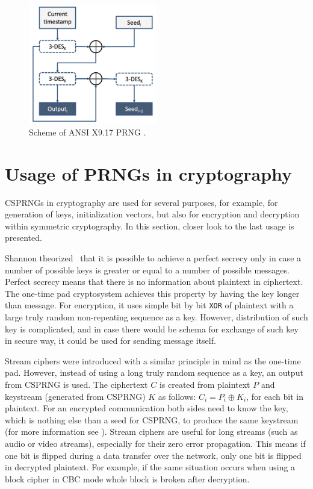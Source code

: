 \documentclass[
    digital,    %
    oneside,    %
    color,
    11pt,
    nocover,
    notable,
    nolof,
    nolot,
    final
]{fithesis3}
\renewcommand\_{\textunderscore\allowbreak}
\begin{document}
\begin{figure}[h]
	\centering
	\includegraphics[width=0.5\textwidth]{./images/pictures/x9-17-prng.png}
	\caption{Scheme of ANSI X9.17 PRNG \cite{ansi1985american,kelsey1998cryptanalytic}.}
	\label{fig:x9-17}
\end{figure}

\section{Usage of PRNGs in cryptography}

CSPRNGs in cryptography are used for several purposes, for example, for generation of keys, initialization vectors, but also for encryption and decryption within symmetric cryptography. In this section, closer look to the last usage is presented.

Shannon theorized~\cite{perfect-secrecy} that it is possible to achieve a perfect secrecy only in case a number of possible keys is greater or equal to a number of possible messages. Perfect secrecy means that there is no information about plaintext in ciphertext. The one-time pad cryptosystem achieves this property by having the key longer than message. For encryption, it uses simple bit by bit \texttt{XOR} of plaintext with a large truly random non-repeating sequence as a key. However, distribution of such key is complicated, and in case there would be schema for exchange of such key in secure way, it could be used for sending message itself. \cite{schneier1996applied}

Stream ciphers were introduced with a similar principle in mind as the one-time pad. However, instead of using a long truly random sequence as a key, an output from CSPRNG is used. The ciphertext $C$ is created from plaintext $P$ and keystream (generated from CSPRNG) $K$ as follows: $C_{i} = P_{i} \oplus K_{i}$, for each bit in plaintext. For an encrypted communication both sides need to know the key, which is nothing else than a seed for CSPRNG, to produce the same keystream (for more information see \cite{schneier1996applied}). Stream ciphers are useful for long streams (such as audio or video streams), especially for their zero error propagation. This means if one bit is flipped during a data transfer over the network, only one bit is flipped in decrypted plaintext. For example, if the same situation occurs when using a block cipher in CBC mode whole block is broken after decryption.
\end{document}
